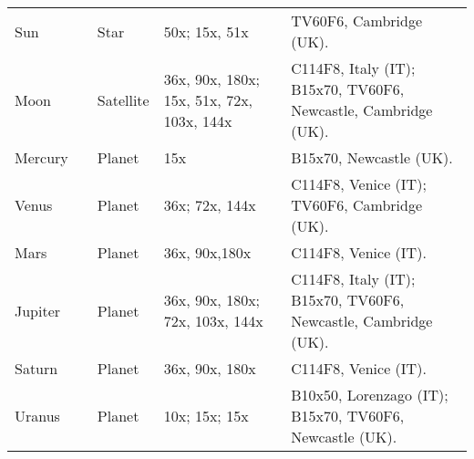 \begin{longtable}{ p{0.7in}  p{0.3in}  p{0.6in}  p{0.9in}  p{5.8in} }
Sun &  & Star & 50x; 15x, 51x & TV60F6, Cambridge (UK). \\ 
Moon &  & Satellite & 36x, 90x, 180x; 15x, 51x, 72x, 103x, 144x & C114F8, Italy (IT); B15x70, TV60F6, Newcastle, Cambridge (UK). \\ 
Mercury &  & Planet & 15x & B15x70, Newcastle (UK). \\ 
Venus &  & Planet & 36x; 72x, 144x & C114F8, Venice (IT); TV60F6, Cambridge (UK). \\ 
Mars &  & Planet & 36x, 90x,180x & C114F8, Venice (IT). \\ 
Jupiter &  & Planet & 36x, 90x, 180x; 72x, 103x, 144x & C114F8, Italy (IT); B15x70, TV60F6, Newcastle, Cambridge (UK). \\ 
Saturn &  & Planet & 36x, 90x, 180x & C114F8, Venice (IT). \\ 
Uranus &  & Planet & 10x; 15x; 15x & B10x50, Lorenzago (IT); B15x70, TV60F6, Newcastle (UK). \\ 
\hline 
\end{longtable} 
